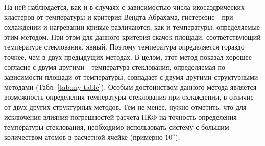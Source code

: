 На ней наблюдается, как и в случаях с зависимостью числа икосаэдрических кластеров от температуры и критерия Вендта-Абрахама, гистерезис - при охлаждении и нагревании кривые различаются, как и температуры, определяемые этим методом. При этом для данного критерия скачок площади, соответствующий температуре стеклования, явный. Поэтому температура определяется гораздо точнее, чем в двух предыдущих методах. В целом, этот метод показал хорошее согласие с двумя другими - температура стеклования, определяемая по зависимости площади от температуры, совпадает с двумя другими структурными методами (Табл. \ref{tab:my-table}). Особым достоинством данного метода является возможность определения температуры стеклования при охлаждении,  в отличие от двух других структурных методов. Тем не менее, нужно отметить, что для исключения влияния погрешностей расчета ПКФ на точность определения температуры стеклования, необходимо использовать систему с большим количеством атомов в расчетной ячейке (примерно $10^5$). 


\begin{table}[h!]
	\centering
	\caption{Таблица температур стеклования для скорости $11\cdot10^{12}  \text{ K/пс}$.}
	\label{tab:my-table}
\end{table}
